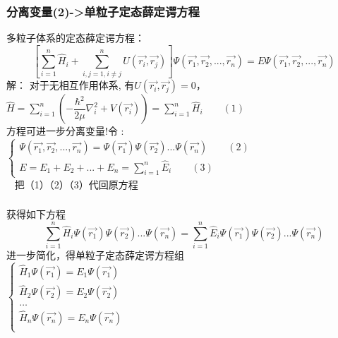 \begin{frame}
	\frametitle{分离变量(2)->单粒子定态薛定谔方程}
	多粒子体系的定态薛定谔方程：   
	\begin{equation*}
		\left [ \sum\limits_{i=1}^{n} \hat{H}_i + \sum_{i,j=1, i\ne j}^{n}  U(\vec{r_i},\vec{r_j}) \right ]	\Psi (\vec{r_1},\vec{r_2},...,\vec{r_n})=E 	\Psi (\vec{r_1},\vec{r_2},...,\vec{r_n})
	\end{equation*}		
	\alert{解：}  	对于无相互作用体系, 
	有$ U(\vec{r_i},\vec{r_j}) =0 $，\\
	 $ \hat{H}= \sum\limits_{i=1}^{n} (-\dfrac{\hbar^2}{2\mu }\nabla ^2 _i + V(\vec{r_i})) =\sum\limits_{i=1}^{n} \hat{H}_i \qquad (1)$\\   \vspace{0.3cm}
	方程可进一步分离变量!令 : \\
	 $\displaystyle \begin{cases}
	   	\Psi (\vec{r_1},\vec{r_2},...,\vec{r_n}) = \Psi (\vec{r_1}) \Psi (\vec{r_2})...\Psi (\vec{r_n}) \qquad (2) \\
		E= E_1+ E_2 + ... + E_n=\sum\limits_{i=1}^{n} \hat{E}_i \qquad (3)
	\end{cases}$ \\ \vspace{0.3em}
 	把（1）（2）（3）代回原方程
\end{frame}

\begin{frame}
	\frametitle{}
	获得如下方程
	\[ \sum\limits_{i=1}^{n} \hat{H}_i\Psi (\vec{r_1}) \Psi (\vec{r_2})...\Psi (\vec{r_n})= \sum\limits_{i=1}^{n} \hat{E}_i\Psi (\vec{r_1}) \Psi (\vec{r_2})...\Psi (\vec{r_n}) \]
	进一步简化，得单粒子定态薛定谔方程组\\
	$\displaystyle \begin{cases}
		\hat{H}_1\Psi (\vec{r_1})=E_1 \Psi (\vec{r_1})  \\  
		\hat{H}_2\Psi (\vec{r_2})=E_2 \Psi (\vec{r_2})  \\
		\dots\\
		\hat{H}_n\Psi (\vec{r_n})=E_n \Psi (\vec{r_n})  \\
	\end{cases}$ \\	
\end{frame}

